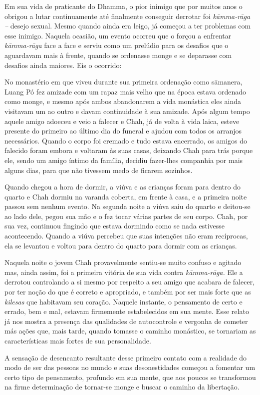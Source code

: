 Em sua vida de praticante do Dhamma, o pior inimigo que por muitos anos
o obrigou a lutar continuamente até finalmente conseguir derrotar foi
\emph{kāmma-rāga --} desejo sexual. Mesmo quando ainda era leigo, já
começou a ter problemas com esse inimigo. Naquela ocasião, um evento
ocorreu que o forçou a enfrentar \emph{kāmma-rāga} face a face e serviu
como um prelúdio para os desafios que o aguardavam mais à frente, quando
se ordenasse monge e se deparasse com desafios ainda maiores. Eis o
ocorrido:

No monastério em que viveu durante sua primeira ordenação como sāmanera,
Luang Pó fez amizade com um rapaz mais velho que na época estava
ordenado como monge, e mesmo após ambos abandonarem a vida monástica
eles ainda visitavam um ao outro e davam continuidade à sua amizade.
Após algum tempo aquele amigo adoeceu e veio a falecer e Chah, já de
volta à vida laica, esteve presente do primeiro ao último dia do funeral
e ajudou com todos os arranjos necessários. Quando o corpo foi cremado e
tudo estava encerrado, os amigos do falecido foram embora e voltaram às
suas casas, deixando Chah para trás porque ele, sendo um amigo íntimo da
família, decidiu fazer-lhes companhia por mais alguns dias, para que não
tivessem medo de ficarem sozinhos.

Quando chegou a hora de dormir, a viúva e as crianças foram para dentro
do quarto e Chah dormiu na varanda coberta, em frente à casa, e a
primeira noite passou sem nenhum evento. Na segunda noite a viúva saiu
do quarto e deitou-se ao lado dele, pegou sua mão e o fez tocar várias
partes de seu corpo. Chah, por sua vez, continuou fingindo que estava
dormindo como se nada estivesse acontecendo. Quando a viúva percebeu que
suas intenções não eram recíprocas, ela se levantou e voltou para dentro
do quarto para dormir com as crianças.

Naquela noite o jovem Chah provavelmente sentiu-se muito confuso e
agitado mas, ainda assim, foi a primeira vitória de sua vida contra
\emph{kāmma-rāga.} Ele a derrotou controlando a si mesmo por respeito a
seu amigo que acabara de falecer, por ter noção do que é correto e
apropriado, e também por ser mais forte que as \emph{kilesas} que
habitavam seu coração. Naquele instante, o pensamento de certo e errado,
bem e mal, estavam firmemente estabelecidos em sua mente. Esse relato já
nos mostra a presença das qualidades de autocontrole e vergonha de
cometer más ações que, mais tarde, quando tomasse o caminho monástico,
se tornariam as características mais fortes de sua personalidade.

A sensação de desencanto resultante desse primeiro contato com a
realidade do modo de ser das pessoas no mundo e suas desonestidades
começou a fomentar um certo tipo de pensamento, profundo em sua mente,
que aos poucos se transformou na firme determinação de tornar-se monge e
buscar o caminho da libertação.

